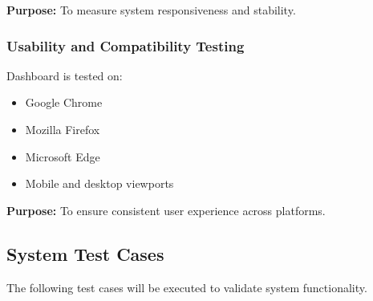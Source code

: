 \documentclass[12pt]{article}
\begin{document}
\textbf{Purpose:}  
To measure system responsiveness and stability.

\subsubsection{Usability and Compatibility Testing}

Dashboard is tested on:

\begin{itemize}
\item Google Chrome
\item Mozilla Firefox
\item Microsoft Edge
\item Mobile and desktop viewports
\end{itemize}

\textbf{Purpose:}  
To ensure consistent user experience across platforms.

\subsection{System Test Cases}

The following test cases will be executed to validate system functionality.
\end{document}
